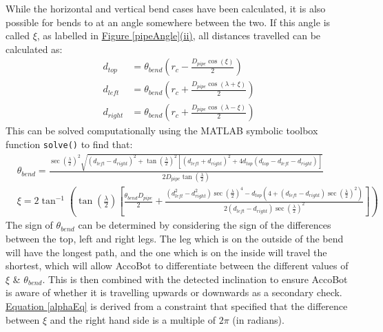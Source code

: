 \documentclass[11pt]{article}		%
\newcommand{\equationref}[1]{\hyperref[#1]{Equation \ref*{#1}}}     %
\begin{document}
			While the horizontal and vertical bend cases have been calculated, it is also possible for bends to at an angle somewhere between the two.
			If this angle is called $\xi$, as labelled in \hyperref[pipeAngle]{Figure \ref*{pipeAngle}(ii)}, all distances travelled can be calculated as:
			\begin{align}
				d_{top} &= \theta_{bend} \left( r_c - \frac{D_{pipe} \cos \left( \xi \right)}{2} \right) \label{d_top}
				\\
				d_{left} &= \theta_{bend} \left( r_c +  \frac{D_{pipe} \cos \left( \lambda + \xi \right)}{2} \right) \label{d_left}
				\\
				d_{right} &= \theta_{bend} \left( r_c +  \frac{D_{pipe} \cos \left( \lambda - \xi \right)}{2} \right) \label{d_right}
			\end{align}
			This can be solved computationally using the MATLAB symbolic toolbox function \verb|solve()| to find that:	
			\fontsize{10}{\baselineskip}
			\begin{align}
				&\theta_{bend} = \frac{ \sec \left( \frac{\lambda}{2} \right)^2 \sqrt{ \left( d_{left} - d_{right} \right)^2 +  \tan \left( \frac{\lambda}{2} \right)^2 \left[ \left( d_{left} + d_{right} \right)^2 + 4 d_{top} \left( d_{top} - d_{left} - d_{right} \right) \right] } }{2 D_{pipe} \tan \left( \frac{\lambda}{2} \right)} \label{generalTheta}
				\\
				&\xi = 2 \tan^{-1} \left( \tan \left( \frac{\lambda}{2} \right) \left[\frac{ \theta_{bend} D_{pipe}}{2} + \frac{\left( d_{left}^2 - d_{right}^2 \right) \sec \left( \frac{\lambda}{2} \right)^4 - d_{top} \left(4 + \left( d_{left} - d_{right} \right) \sec \left( \frac{\lambda}{2} \right)^2 \right)}{2 \left( d_{left} - d_{right} \right) \sec \left( \frac{\lambda}{2} \right)^2} \right] \right) \label{alphaEq}
			\end{align}
			\fontsize{11}{\baselineskip}
			The sign of $\theta_{bend}$ can be determined by considering the sign of the differences between the top, left and right legs.
			The leg which is on the outside of the bend will have the longest path, and the one which is on the inside will travel the shortest, which will allow AccoBot to differentiate between the different values of $\xi$ \& $\theta_{bend}$.
			This is then combined with the detected inclination to ensure AccoBot is aware of whether it is travelling upwards or downwards as a secondary check.
			\\
			\equationref{alphaEq} is derived from a constraint that specified that the difference between $\xi$ and the right hand side is a multiple of $2 \pi$ (in radians).
\end{document}
